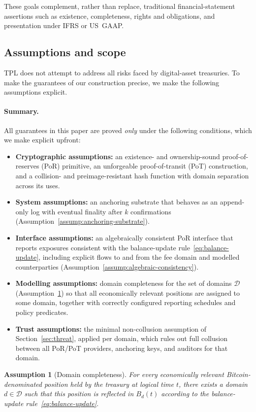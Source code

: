 \documentclass[11pt]{article}
\newtheorem{assumption}{Assumption}
\begin{document}
These goals complement, rather than replace, traditional financial-statement assertions such as existence, completeness, rights and obligations, and presentation under IFRS or US~GAAP.

\subsection{Assumptions and scope}

TPL does not attempt to address all risks faced by digital-asset treasuries.
To make the guarantees of our construction precise, we make the following assumptions explicit.
\paragraph{Summary.}
All guarantees in this paper are proved \emph{only} under the following conditions, which we make explicit upfront:
\begin{itemize}[noitemsep]
\item \textbf{Cryptographic assumptions:} an existence- and ownership-sound proof-of-reserves (PoR) primitive, an unforgeable proof-of-transit (PoT) construction, and a collision- and preimage-resistant hash function with domain separation across its uses.
\item \textbf{System assumptions:} an anchoring substrate that behaves as an append-only log with eventual finality after $k$ confirmations (Assumption~\ref{assump:anchoring-substrate}).
\item \textbf{Interface assumptions:} an algebraically consistent PoR interface that reports exposures consistent with the balance-update rule~\eqref{eq:balance-update}, including explicit flows to and from the fee domain and modelled counterparties (Assumption~\ref{assump:algebraic-consistency}).
\item \textbf{Modelling assumptions:} domain completeness for the set of domains $\mathcal{D}$ (Assumption~\ref{assump:domain-completeness}) so that all economically relevant positions are assigned to some domain, together with correctly configured reporting schedules and policy predicates.
\item \textbf{Trust assumptions:} the minimal non-collusion assumption of Section~\ref{sec:threat}, applied per domain, which rules out full collusion between all PoR/PoT providers, anchoring keys, and auditors for that domain.
\end{itemize}

\begin{assumption}[Domain completeness]
\label{assump:domain-completeness}
For every economically relevant Bitcoin-denominated position held by the treasury at logical time $t$, there exists a domain $d \in \mathcal{D}$ such that this position is reflected in $B_d(t)$ according to the balance-update rule~\eqref{eq:balance-update}.
\end{assumption}
\end{document}
